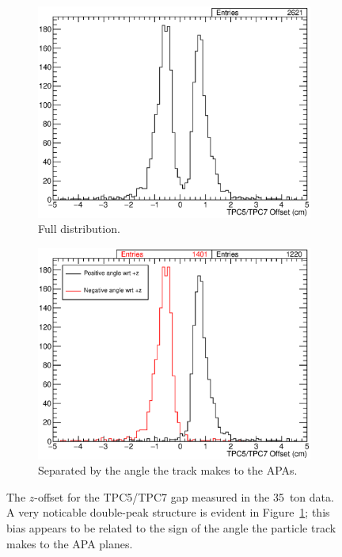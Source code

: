 \begin{figure}
  \centering
  \begin{subfigure}[t]{\linewidth}
    \centering
    \includegraphics[width=12cm]{TPC5TPC7Gap.eps}
    \caption{Full distribution.}
    \label{fig:TPC5TPC7Gap}
  \end{subfigure}
  \hfill
  \begin{subfigure}[t]{\linewidth}
    \centering
    \includegraphics[width=12cm]{TPC5TPC7GapAngle.eps}
    \caption{Separated by the angle the track makes to the APAs.}
    \label{fig:TPC5TPC7GapAngle}
  \end{subfigure}
  \caption{The $z$-offset for the TPC5/TPC7 gap measured in the 35~ton data.  A very noticable double-peak structure is evident in Figure~\ref{fig:TPC5TPC7Gap}; this bias appears to be related to the sign of the angle the particle track makes to the APA planes.}
  \label{fig:TPC5TPC7XOffsetZOffset}
\end{figure}

